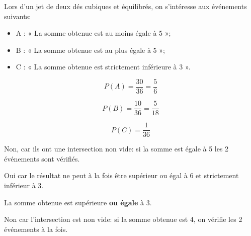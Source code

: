 
Lors d'un jet de deux dés cubiques et équilibrés, on s'intéresse aux événements suivants:

\begin{itemize}
\item A : « La somme obtenue est au moins égale à 5 »;
\item B : « La somme obtenue est au plus égale à 5 »;
\item C : « La somme obtenue est strictement inférieure à 3 ».
\end{itemize}


\[P(A) = \dfrac{30}{36} = \dfrac{5}{6}\]

\[P(B) = \dfrac{10}{36} = \dfrac{5}{18}\]

\[P(C) = \dfrac{1}{36}\]


Non, car ils ont une intersection non vide: si la somme est égale à 5 les 2 événements sont vérifiés. 


Oui car le résultat ne peut à la fois être supérieur ou égal à 6 et strictement inférieur à 3.


La somme obtenue est supérieure \textbf{ou égale} à 3.


Non car l'intersection est non vide: si la somme obtenue est 4, on vérifie les 2 événements à la fois.
